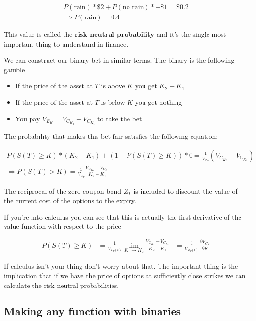 \begin{eqnarray*}
P(\mbox{rain})*\$2 +P(\mbox{no rain})*-\$1 = \$0.2\\
\Rightarrow P(\mbox{rain}) = 0.4
\end{eqnarray*}

This value is called the \textbf{risk neutral probability} and it's the single most important thing to understand in finance. 

We can construct our binary bet in similar terms. The binary is the following gamble

\begin{itemize}
\item If the price of the asset at $T$ is above $K$ you get $K_2-K_1$
\item If the price of the asset at $T$ is below $K$ you get nothing
\item You pay $V_{B_K} = V_{C_{K_2}}-V_{C_{K_1}}$ to take the bet
\end{itemize}

The probability that makes this bet fair satisfies the following equation:

\begin{eqnarray*}
P(S(T)\geq K)*(K_2-K_1) + (1-P(S(T) \geq K))*0 =  \frac{1}{V_{Z_T}}\left(V_{C_{K_2}}-V_{C_{K_1}}\right)\\
\Rightarrow P(S(T)>K) = \frac{1}{V_{Z_T}}\frac{V_{C_{K_2}}-V_{C_{K_1}}}{K_2-K_1}
\end{eqnarray*}

The reciprocal of the zero coupon bond $Z_T$ is included to discount the value of the current cost of the options to the expiry.

If you're into calculus you can see that this is actually the first derivative of the value function with respect to the price

\begin{eqnarray*}
P(S(T) \geq K) &=\frac{1}{V_{Z_T(t)}} \lim_{K_1\rightarrow K_2} \frac{V_{C_{K_2}}-V_{C_{K_1}}}{K_2-K_1}
 &= \frac{1}{V_{Z_T(t)}}\frac{\partial V_{C_K}}{\partial K}
 \end{eqnarray*}

If calculus isn't your thing don't worry about that. The important thing is the implication that if we have the price of options at sufficiently close strikes we can calculate the risk neutral probabilities. 

\subsection{Making any function with binaries}

